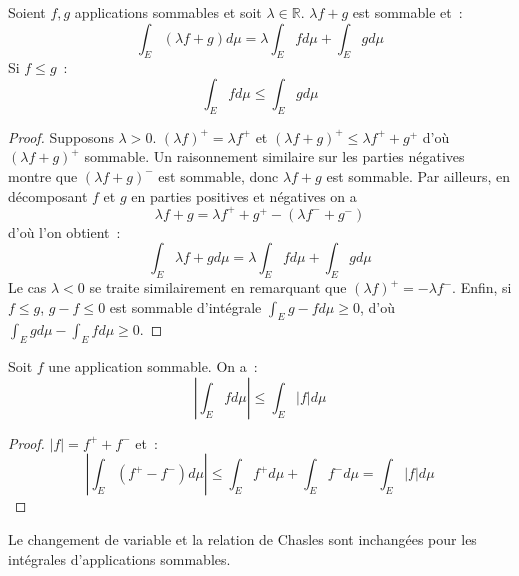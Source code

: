 \begin{mandatory}
\begin{prop}
Soient $f,g$ applications sommables et soit $\lambda \in \mathbb{R}$.
$\lambda f + g$ est sommable et~:
\[
\int_E \left( \lambda f + g\right) d \mu = \lambda \int_E f  d \mu + \int_E g d
\mu
\]
Si $f \leq g$~:
\[
\int_E f d \mu \leq \int_E g d \mu
\]
\end{prop}
\end{mandatory}
\begin{proof}
Supposons $\lambda > 0$. $(\lambda f )^+ =\lambda f^+$ et $(\lambda f + g)^+
\leq \lambda f^+ + g ^+$ d'où $(\lambda f + g )^+$ sommable. Un
raisonnement similaire sur les parties négatives montre que $(\lambda
f + g)^-$ est sommable, donc $\lambda f + g$ est
sommable. Par ailleurs, en décomposant $f$ et $g$ en parties positives
et négatives on a~
\[
\lambda f + g = \lambda f^+ + g^+ -(\lambda f^- +
g^-)
\]
d'où l'on obtient~:
\[
\int_E \lambda f + g d \mu = \lambda \int_E f d \mu + \int_E g d\mu
\]
Le cas $\lambda < 0$ se traite similairement en remarquant que
$(\lambda f)^+ = - \lambda f^-$.
Enfin, si $f \leq g$, $g-f \leq0$ est sommable d'intégrale $\int_E g-f
d \mu \geq 0 $, d'où $\int_E g d\mu - \int_E f d \mu \geq 0$.
\end{proof}
\begin{mandatory}
\begin{prop}
Soit $f$ une application sommable. On a~:
\[
\left |  \int_E f d \mu \right | \leq \int_E |f| d \mu
\]
\end{prop}
\end{mandatory}
\begin{proof}
$|f| = f^+ + f^-$ et~:
\[
\left | \int_E \left(f^+ - f^-\right) d \mu \right | \leq \int_E f^+ d \mu +
\int_E f^- d \mu = \int_E |f| d \mu
\]
\end{proof}
Le changement de variable et la relation de Chasles sont inchangées pour les
intégrales d'applications sommables.

